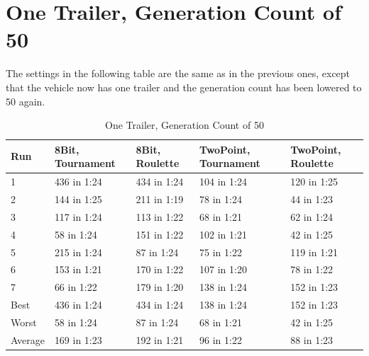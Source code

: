 \section{One Trailer, Generation Count of 50}
\label{sec:no_trailer_50}

The settings in the following table are the same as in the previous ones, except that the vehicle now has one trailer and the generation count has been lowered to 50 again.

\begin{table}[H]\caption{One Trailer, Generation Count of 50}
\begin{center}
	\begin{tabular}{| l | l | l | p{3cm} | p{3cm}|}
		\hline
		Run 		& 8Bit, Tournament 	& 8Bit, Roulette 	& TwoPoint, Tournament 	& TwoPoint, Roulette	\\ \hline
		1				&	436 in 1:24				&	434 in 1:24			&	104 in 1:24						&	120 in 1:25					\\ \hline
		2				&	144 in 1:25				&	211 in 1:19			&	78 in 1:24						&	44 in 1:23					\\ \hline
		3				&	117 in 1:24				&	113 in 1:22			&	68 in 1:21						&	62 in 1:24					\\ \hline
		4				&	58 in 1:24				&	151 in 1:22			&	102 in 1:21						&	42 in 1:25					\\ \hline
		5				&	215 in 1:24				&	87 in 1:24			&	75 in 1:22						&	119 in 1:21					\\ \hline
		6				&	153 in 1:21				&	170 in 1:22			&	107 in 1:20						&	78 in 1:22					\\ \hline
		7				&	66 in 1:22				&	179 in 1:20			&	138 in 1:24						&	152 in 1:23					\\ \hline
		Best		&	436 in 1:24				&	434 in 1:24			&	138 in 1:24						&	152 in 1:23					\\ \hline
		Worst		&	58 in 1:24				&	87 in 1:24			&	68 in 1:21						& 42 in 1:25					\\ \hline
		Average	&	169 in 1:23				& 192 in 1:21			& 96 in 1:22						&	88 in 1:23					\\ \hline
		\hline
	\end{tabular}
\end{center}
\end{table}

